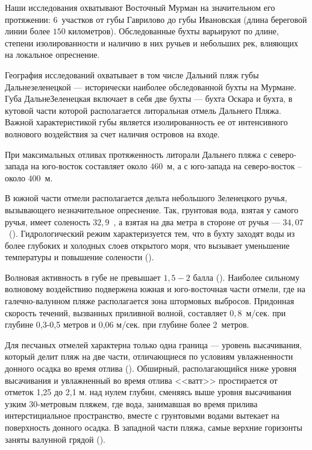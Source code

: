 Наши исследования охватывают Восточный Мурман на значительном его протяжении: $6$~участков от губы Гаврилово до губы Ивановская (длина береговой линии более $150$ километров).
Обследованные бухты варьируют по длине, степени изолированности и наличию в них ручьев и небольших рек, влияющих на локальное опреснение.


География исследований охватывает в том числе Дальний пляж губы Дальнезеленецкой --- исторически наиболее обследованной бухты на Мурмане.
Губа ДальнеЗеленецкая включает в себя две бухты --- бухта Оскара и бухта, в кутовой части которой располагается литоральная отмель Дальнего Пляжа. 
Важной характеристикой губы является изолированность ее от интенсивного волнового воздействия за счет наличия островов на входе.
	
При максимальных отливах протяженность литорали Дальнего пляжа с северо-запада на юго-восток составляет около $460$~м, а с юго-запада на северо-восток -- около $400$~м. 
	
В южной части отмели располагается дельта небольшого Зеленецкого ручья, вызывающего незначительное опреснение. 
Так, грунтовая вода, взятая у самого ручья, имеет соленость $32,9$~\permil, а взятая на два метра в стороне от ручья --- $34,07$~\permil (\cite{Prigorovskiy_1948}). 
Гидрологический режим характеризуется тем, что в бухту заходят воды из более глубоких и холодных слоев открытого моря, что вызывает уменьшение температуры и повышение солености (\cite{Voronkov_et_al_1948}).

Волновая активность в губе не превышает $1,5 - 2$ балла (\cite{Alexeev_1976}). 
Наиболее сильному волновому воздействию подвержена южная и юго-восточная части отмели, где на галечно-валунном пляже располагается зона штормовых выбросов.
Придонная скорость течений, вызванных приливной волной, составляет $0,8$~м/сек. при глубине 0,3-0,5 метров и 0,06 м/сек. при глубине более $2$~метров.

Для песчаных отмелей характерна только одна граница --- уровень высачивания, который делит пляж на две части, отличающиеся по условиям увлажненности донного осадка во время отлива (\cite{Streltsov_Agarova_1978}). 
Обширный, располагающийся ниже уровня высачивания и увлажненный во время отлива <<ватт>> простирается от отметок 1,25 до 2,1 м. над нулем глубин, сменяясь выше уровня высачивания узким $30$-метровым пляжем, где вода, занимавшая во время прилива интерстициальное пространство, вместе с грунтовыми водами вытекает на поверхность донного осадка. 
В западной части пляжа, самые верхние горизонты заняты валунной грядой (\cite{Agarova_et_al_1976}). 

